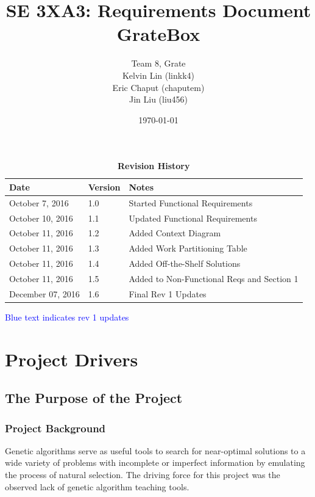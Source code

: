 \documentclass[12pt, titlepage]{article}
\title{SE 3XA3: Requirements Document\\GrateBox}
\author{Team 8, Grate
		\\ Kelvin Lin (linkk4)
		\\ Eric Chaput (chaputem)
		\\ Jin Liu (liu456)
}
\date{\today}
\begin{document}
\maketitle

\tableofcontents
\listoftables
\listoffigures

\begin{table}[h]
\caption{\bf Revision History}
\begin{tabularx}{\textwidth}{p{3.5cm}p{2cm}X}
\toprule {\bf Date} & {\bf Version} & {\bf Notes}\\
\midrule
October 7, 2016 & 1.0 & Started Functional Requirements\\
October 10, 2016 & 1.1 & Updated Functional Requirements\\
October 11, 2016 & 1.2 & Added Context Diagram\\
October 11, 2016 & 1.3 & Added Work Partitioning Table\\
October 11, 2016 & 1.4 & Added Off-the-Shelf Solutions\\
October 11, 2016 & 1.5 & Added to Non-Functional Reqs and Section 1\\
December 07, 2016 & 1.6 & Final Rev 1 Updates\\
\bottomrule
\end{tabularx}
\end{table}

\newpage

\textcolor{blue}{Blue text indicates rev 1 updates}

\section{Project Drivers}

\subsection{The Purpose of the Project}

\subsubsection{Project Background}

Genetic algorithms serve as useful tools to search for near-optimal solutions to 
a wide variety of problems with incomplete or imperfect information by emulating 
the process of natural selection. The driving force for this project was the 
observed lack of genetic algorithm teaching tools. 
\end{document}
